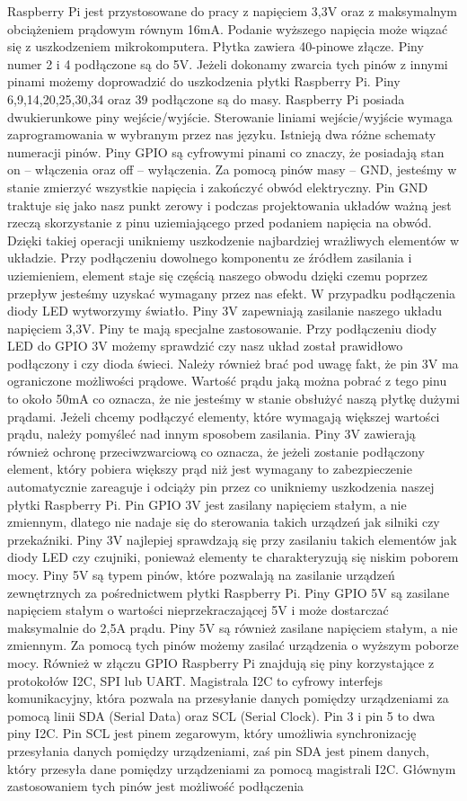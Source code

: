 Raspberry Pi jest przystosowane do pracy z napięciem 3,3V oraz z maksymalnym obciążeniem prądowym równym 16mA. Podanie wyższego napięcia może wiązać się z uszkodzeniem mikrokomputera. Płytka zawiera 40-pinowe złącze. Piny numer 2 i 4 podłączone są do 5V. Jeżeli dokonamy zwarcia tych pinów z innymi pinami możemy doprowadzić do uszkodzenia płytki Raspberry Pi. Piny 6,9,14,20,25,30,34 oraz 39 podłączone są do masy. Raspberry Pi posiada dwukierunkowe piny wejście/wyjście. Sterowanie liniami wejście/wyjście wymaga zaprogramowania w wybranym przez nas języku. Istnieją dwa różne schematy numeracji pinów. Piny GPIO są cyfrowymi pinami co znaczy, że posiadają stan on – włączenia oraz off – wyłączenia. Za pomocą pinów masy – GND, jesteśmy w stanie zmierzyć wszystkie napięcia i zakończyć obwód elektryczny. Pin GND traktuje się jako nasz punkt zerowy i podczas projektowania układów ważną jest rzeczą skorzystanie z pinu uziemiającego przed podaniem napięcia na obwód. Dzięki takiej operacji unikniemy uszkodzenie najbardziej wrażliwych elementów w układzie. Przy podłączeniu dowolnego komponentu ze źródłem zasilania i uziemieniem, element staje się częścią naszego obwodu dzięki czemu poprzez przepływ jesteśmy uzyskać wymagany przez nas efekt. W przypadku podłączenia diody LED wytworzymy światło. Piny 3V zapewniają zasilanie naszego układu napięciem 3,3V. Piny te mają specjalne zastosowanie. Przy podłączeniu diody LED do GPIO 3V możemy sprawdzić czy nasz układ został prawidłowo podłączony i czy dioda świeci. Należy również brać pod uwagę fakt, że pin 3V ma ograniczone możliwości prądowe. Wartość prądu jaką można pobrać z tego pinu to około 50mA co oznacza, że nie jesteśmy w stanie obsłużyć naszą płytkę dużymi prądami. Jeżeli chcemy podłączyć elementy, które wymagają większej wartości prądu, należy pomyśleć nad innym sposobem zasilania. Piny 3V zawierają również ochronę przeciwzwarciową co oznacza, że jeżeli zostanie podłączony element, który pobiera większy prąd niż jest wymagany to zabezpieczenie automatycznie zareaguje i odciąży pin przez co unikniemy uszkodzenia naszej płytki Raspberry Pi. Pin GPIO 3V jest zasilany napięciem stałym, a nie zmiennym, dlatego nie nadaje się do sterowania takich urządzeń jak silniki czy przekaźniki. Piny 3V najlepiej sprawdzają się przy zasilaniu takich elementów jak diody LED czy czujniki, ponieważ elementy te charakteryzują się niskim poborem mocy. Piny 5V są typem pinów, które pozwalają na zasilanie urządzeń zewnętrznych za pośrednictwem płytki Raspberry Pi. Piny GPIO 5V są zasilane napięciem stałym o wartości nieprzekraczającej 5V i może dostarczać maksymalnie do 2,5A prądu. Piny 5V są również zasilane napięciem stałym, a nie zmiennym. Za pomocą tych pinów możemy zasilać urządzenia o wyższym poborze mocy. Również w złączu GPIO Raspberry Pi znajdują się piny korzystające z protokołów I2C, SPI lub UART. Magistrala I2C to cyfrowy interfejs komunikacyjny, która pozwala na przesyłanie danych pomiędzy urządzeniami za pomocą linii SDA (Serial Data) oraz SCL (Serial Clock). Pin 3 i pin 5 to dwa piny I2C. Pin SCL jest pinem zegarowym, który umożliwia synchronizację przesyłania danych pomiędzy urządzeniami, zaś pin SDA jest pinem danych, który przesyła dane pomiędzy urządzeniami za pomocą magistrali I2C. Głównym zastosowaniem tych pinów jest możliwość podłączenia 